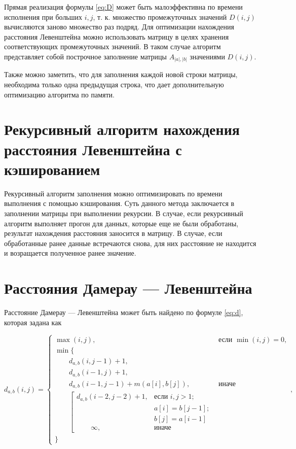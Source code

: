 Прямая реализация формулы \ref{eq:D} может быть малоэффективна по времени исполнения при больших $i, j$, т. к. множество промежуточных значений $D(i, j)$ вычисляются заново множество раз подряд. Для оптимизации нахождения расстояния Левенштейна можно использовать матрицу в целях хранения соответствующих промежуточных значений. В таком случае алгоритм представляет собой построчное заполнение матрицы $A_{|a|,|b|}$ значениями $D(i, j)$.

Также можно заметить, что для заполнения каждой новой строки матрицы, необходима только одна предыдущая строка, что дает дополнительную оптимизацию алгоритма по памяти.

\section{Рекурсивный алгоритм нахождения расстояния Левенштейна с кэшированием}

\label{sec:recmat}


Рекурсивный алгоритм заполнения можно оптимизировать по времени выполнения с помощью кэширования. Суть данного метода заключается в заполнении матрицы при выполнении рекурсии. В случае, если рекурсивный алгоритм выполняет прогон для данных, которые еще не были обработаны, результат нахождения расстояния заносится в матрицу. В случае, если обработанные ранее данные встречаются снова, для них расстояние не находится и возращается полученное ранее значение.


\section{Расстояния Дамерау — Левенштейна}

Расстояние Дамерау — Левенштейна может быть найдено по формуле \ref{eq:d}, которая задана как

\begin{equation}
\label{eq:d}
d_{a,b}(i, j) = \begin{cases}
\max(i, j), &\text{если }\min(i, j) = 0,\\
\min \lbrace \\
\qquad d_{a,b}(i, j-1) + 1,\\
\qquad d_{a,b}(i-1, j) + 1,\\
\qquad d_{a,b}(i-1, j-1) + m(a[i], b[j]), &\text{иначе}\\
\qquad \left[ \begin{array}{cc}d_{a,b}(i-2, j-2) + 1, &\text{если }i,j > 1;\\
\qquad &\text{}a[i] = b[j-1]; \\
\qquad &\text{}b[j] = a[i-1]\\
\qquad \infty, & \text{иначе}\end{array}\right.\\
\rbrace
\end{cases},
\end{equation}

